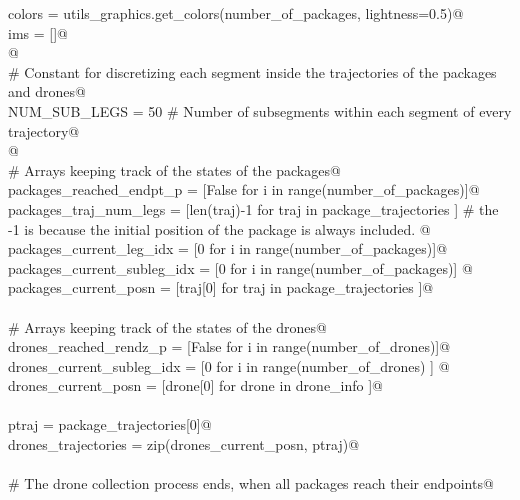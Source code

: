 \documentclass[10.0pt]{report}
\begin{document}
\begin{appendices}
\begin{flushleft}
\begin{list}{}{}
\mbox{}\verb@    colors             = utils_graphics.get_colors(number_of_packages, lightness=0.5)@\\
\mbox{}\verb@    ims                = []@\\
\mbox{}\verb@    @\\
\mbox{}\verb@    # Constant for discretizing each segment inside the trajectories of the packages and drones@\\
\mbox{}\verb@    NUM_SUB_LEGS              = 50 # Number of subsegments within each segment of every trajectory@\\
\mbox{}\verb@    @\\
\mbox{}\verb@    # Arrays keeping track of the states of the packages@\\
\mbox{}\verb@    packages_reached_endpt_p    = [False        for  i    in range(number_of_packages)]@\\
\mbox{}\verb@    packages_traj_num_legs      = [len(traj)-1  for  traj in package_trajectories     ] # the -1 is because the initial position of the package is always included. @\\
\mbox{}\verb@    packages_current_leg_idx    = [0            for  i    in range(number_of_packages)]@\\
\mbox{}\verb@    packages_current_subleg_idx = [0            for  i    in range(number_of_packages)] @\\
\mbox{}\verb@    packages_current_posn       = [traj[0]      for traj in package_trajectories    ]@\\
\mbox{}\verb@@\\
\mbox{}\verb@    # Arrays keeping track of the states of the drones@\\
\mbox{}\verb@    drones_reached_rendz_p    = [False          for  i    in range(number_of_drones)]@\\
\mbox{}\verb@    drones_current_subleg_idx = [0              for i    in range(number_of_drones) ] @\\
\mbox{}\verb@    drones_current_posn       = [drone[0]       for drone in drone_info             ]@\\
\mbox{}\verb@@\\
\mbox{}\verb@    ptraj               = package_trajectories[0]@\\
\mbox{}\verb@    drones_trajectories = zip(drones_current_posn, ptraj)@\\
\mbox{}\verb@@\\
\mbox{}\verb@    # The drone collection process ends, when all packages reach their endpoints@\\

\end{list}
\end{flushleft}
\end{appendices}
\end{document}
